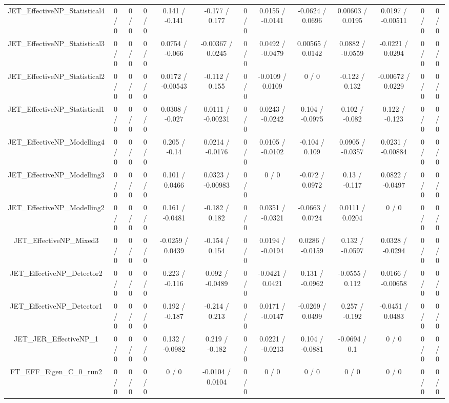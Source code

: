 \documentclass[10pt]{article}
\begin{document}
\begin{table}[htbp]
\begin{center}
\begin{tabular}{|c|c|c|c|c|c|c|c|c|c|c|c|c|}
  JET_EffectiveNP_Statistical4 & 0 / 0 & 0 / 0 & 0 / 0 & 0.141 / -0.141 & -0.177 / 0.177 & 0 / 0 & 0.0155 / -0.0141 & -0.0624 / 0.0696 & 0.00603 / 0.0195 & 0.0197 / -0.00511 & 0 / 0 & 0 / 0 \\ 
  JET_EffectiveNP_Statistical3 & 0 / 0 & 0 / 0 & 0 / 0 & 0.0754 / -0.066 & -0.00367 / 0.0245 & 0 / 0 & 0.0492 / -0.0479 & 0.00565 / 0.0142 & 0.0882 / -0.0559 & -0.0221 / 0.0294 & 0 / 0 & 0 / 0 \\ 
  JET_EffectiveNP_Statistical2 & 0 / 0 & 0 / 0 & 0 / 0 & 0.0172 / -0.00543 & -0.112 / 0.155 & 0 / 0 & -0.0109 / 0.0109 & 0 / 0 & -0.122 / 0.132 & -0.00672 / 0.0229 & 0 / 0 & 0 / 0 \\ 
  JET_EffectiveNP_Statistical1 & 0 / 0 & 0 / 0 & 0 / 0 & 0.0308 / -0.027 & 0.0111 / -0.00231 & 0 / 0 & 0.0243 / -0.0242 & 0.104 / -0.0975 & 0.102 / -0.082 & 0.122 / -0.123 & 0 / 0 & 0 / 0 \\ 
  JET_EffectiveNP_Modelling4 & 0 / 0 & 0 / 0 & 0 / 0 & 0.205 / -0.14 & 0.0214 / -0.0176 & 0 / 0 & 0.0105 / -0.0102 & -0.104 / 0.109 & 0.0905 / -0.0357 & 0.0231 / -0.00884 & 0 / 0 & 0 / 0 \\ 
  JET_EffectiveNP_Modelling3 & 0 / 0 & 0 / 0 & 0 / 0 & 0.101 / 0.0466 & 0.0323 / -0.00983 & 0 / 0 & 0 / 0 & -0.072 / 0.0972 & 0.13 / -0.117 & 0.0822 / -0.0497 & 0 / 0 & 0 / 0 \\ 
  JET_EffectiveNP_Modelling2 & 0 / 0 & 0 / 0 & 0 / 0 & 0.161 / -0.0481 & -0.182 / 0.182 & 0 / 0 & 0.0351 / -0.0321 & -0.0663 / 0.0724 & 0.0111 / 0.0204 & 0 / 0 & 0 / 0 & 0 / 0 \\ 
  JET_EffectiveNP_Mixed3 & 0 / 0 & 0 / 0 & 0 / 0 & -0.0259 / 0.0439 & -0.154 / 0.154 & 0 / 0 & 0.0194 / -0.0194 & 0.0286 / -0.0159 & 0.132 / -0.0597 & 0.0328 / -0.0294 & 0 / 0 & 0 / 0 \\ 
  JET_EffectiveNP_Detector2 & 0 / 0 & 0 / 0 & 0 / 0 & 0.223 / -0.116 & 0.092 / -0.0489 & 0 / 0 & -0.0421 / 0.0421 & 0.131 / -0.0962 & -0.0555 / 0.112 & 0.0166 / -0.00658 & 0 / 0 & 0 / 0 \\ 
  JET_EffectiveNP_Detector1 & 0 / 0 & 0 / 0 & 0 / 0 & 0.192 / -0.187 & -0.214 / 0.213 & 0 / 0 & 0.0171 / -0.0147 & -0.0269 / 0.0499 & 0.257 / -0.192 & -0.0451 / 0.0483 & 0 / 0 & 0 / 0 \\ 
  JET_JER_EffectiveNP_1 & 0 / 0 & 0 / 0 & 0 / 0 & 0.132 / -0.0982 & 0.219 / -0.182 & 0 / 0 & 0.0221 / -0.0213 & 0.104 / -0.0881 & -0.0694 / 0.1 & 0 / 0 & 0 / 0 & 0 / 0 \\ 
  FT_EFF_Eigen_C_0_run2 & 0 / 0 & 0 / 0 & 0 / 0 & 0 / 0 & -0.0104 / 0.0104 & 0 / 0 & 0 / 0 & 0 / 0 & 0 / 0 & 0 / 0 & 0 / 0 & 0 / 0 \\ 

\end{tabular}
\end{center}
\end{table}
\end{document}
